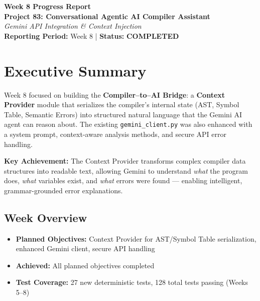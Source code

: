 \documentclass[a4paper,11pt]{article}
\newcommand{\statusgood}[1]{\colorbox{green!20}{\textbf{#1}}}
\begin{document}
    \begin{center}
        {\huge \textbf{Week 8 Progress Report}} \\
        \vspace{3mm}
        {\large \textbf{Project 83: Conversational Agentic AI Compiler Assistant}} \\
        \vspace{2mm}
        \textit{Gemini API Integration \& Context Injection} \\
        \vspace{2mm}
        \textbf{Reporting Period:} Week 8 | \textbf{Status:} \statusgood{COMPLETED}
    \end{center}

    \vspace{5mm}

    \section{Executive Summary}

    Week 8 focused on building the \textbf{Compiler--to--AI Bridge}: a \textbf{Context Provider} module that serializes the compiler's internal state (AST, Symbol Table, Semantic Errors) into structured natural language that the Gemini AI agent can reason about. The existing \texttt{gemini\_client.py} was also enhanced with a system prompt, context-aware analysis methods, and secure API error handling.

    \textbf{Key Achievement:} The Context Provider transforms complex compiler data structures into readable text, allowing Gemini to understand \textit{what} the program does, \textit{what} variables exist, and \textit{what} errors were found --- enabling intelligent, grammar-grounded error explanations.

    \subsection{Week Overview}
    \begin{itemize}[leftmargin=*]
        \item \textbf{Planned Objectives:} Context Provider for AST/Symbol Table serialization, enhanced Gemini client, secure API handling
        \item \textbf{Achieved:} All planned objectives completed
        \item \textbf{Test Coverage:} 27 new deterministic tests, 128 total tests passing (Weeks 5--8)
    \end{itemize}
\end{document}
